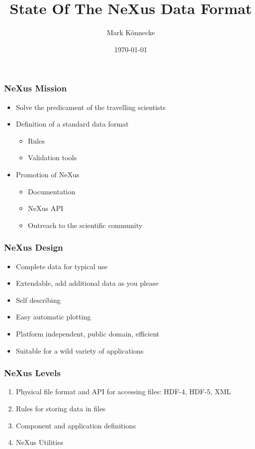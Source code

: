 \documentclass{beamer}
\title{State Of The NeXus Data Format  }
\author{Mark K\"onnecke }
\institute{NeXus International Advisory Committee}
\date{\today}
\begin{document}
\begin{frame}
\titlepage
\end{frame}

\begin{frame} \frametitle{NeXus Mission}
\begin{itemize}
\item Solve the predicament of the travelling scientists
\item Definition of a standard data format
\begin{itemize}
\item Rules
\item Validation tools
\end{itemize}
\item Promotion of NeXus
\begin{itemize}
\item Documentation
\item NeXus API
\item Outreach to the scientific community
\end{itemize}
\end{itemize}
\end{frame}

\begin{frame} \frametitle{NeXus Design}
\begin{itemize}
\item Complete data for typical use
\item Extendable, add additional data as you please
\item Self describing
\item Easy automatic plotting
\item Platform independent, public domain, efficient
\item Suitable for a wild variety of applications
\end{itemize}
\end{frame}

\begin{frame}
 \frametitle{NeXus Levels }
\begin{enumerate}
\item Physical file format and API for accessing files: HDF-4, HDF-5, XML
\item Rules for storing data in files
\item Component and application definitions
\item NeXus Utilities
\end{enumerate}
\end{frame}
\end{document}
